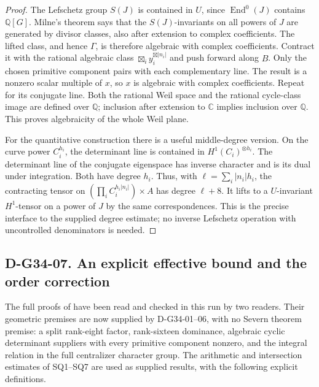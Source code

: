 \begin{proof}
The Lefschetz group \(S(J)\) is contained in \(U\), since
\(\operatorname{End}^0(J)\) contains \(\mathbb Q[G]\).
Milne's theorem \cite[Theorem 3.2; Lemma 3.1]{G34:Milne} says that the
\(S(J)\)-invariants on all powers of \(J\) are generated by divisor
classes, also after extension to complex coefficients.  The lifted class,
and hence \(\Gamma\), is therefore algebraic with complex coefficients.
Contract it with the rational algebraic class
\(\boxtimes_i y_i^{\boxtimes|n_i|}\) and push forward along \(B\).
Only the chosen primitive component pairs with each complementary line.
The result is a nonzero scalar multiple of \(x\), so \(x\) is algebraic
with complex coefficients.  Repeat for its conjugate line.  Both the rational
Weil space and the rational cycle-class image are defined over \(\mathbb Q\);
inclusion after extension to \(\mathbb C\) implies inclusion over
\(\mathbb Q\).  This proves algebraicity of the whole Weil plane.

For the quantitative construction there is a useful middle-degree version.
On the curve power \(C_i^{h_i}\), the determinant line is contained in
\(H^1(C_i)^{\otimes h_i}\).  The determinant line of the conjugate
eigenspace has inverse character and is its dual under integration.  Both
have degree \(h_i\).  Thus, with
\(\ell=\sum_i|n_i|h_i\), the contracting tensor on
\((\prod_i C_i^{h_i|n_i|})\times A\) has degree \(\ell+8\).
It lifts to a \(U\)-invariant \(H^1\)-tensor on a power of \(J\) by the
same correspondences.  This is the precise interface to the supplied degree
estimate; no inverse Lefschetz operation with uncontrolled denominators
is needed.
\end{proof}

\subsection*{D-G34-07. An explicit effective bound and the order correction}

The full proofs of \cite[SQ1--SQ7]{G34:Hecke} have been read and checked in
this run by two readers.  Their geometric premises are now supplied by
D-G34-01--06, with no Severn theorem premise: a split rank-eight factor,
rank-sixteen dominance, algebraic cyclic determinant suppliers with every
primitive component nonzero, and the integral relation in the full
centralizer character group.  The arithmetic and intersection estimates of
SQ1--SQ7 are used as supplied results, with the following explicit definitions.

